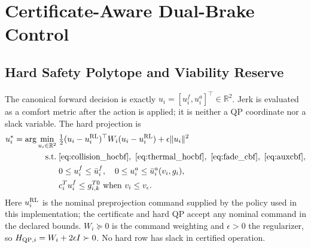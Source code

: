 \section{Certificate-Aware Dual-Brake Control}
\subsection{Hard Safety Polytope and Viability Reserve}
The canonical forward decision is exactly $u_i=[u_i^f,u_i^a]^\top\in\mathbb R^2$. Jerk is evaluated as a comfort metric after the action is applied; it is neither a QP coordinate nor a slack variable. The hard projection is
\begin{subequations}\label{eq:qp}
\begin{align}
u_i^*=\arg\min_{u_i\in\mathbb R^2}\;&\tfrac12(u_i-u_i^{\rm RL})^\top W_i(u_i-u_i^{\rm RL})
+\epsilon\|u_i\|^2\\
\mathrm{s.t.}\;&\eqref{eq:collision_hocbf},\ \eqref{eq:thermal_hocbf},\ \eqref{eq:fade_cbf},\ \eqref{eq:auxcbf},\\
&0\le u_i^f\le\bar u_i^f,\quad 0\le u_i^a\le\bar u_i^a(v_i,g_i),\\
&c_i^Tu_i^f\le g_{i,k}^{T0}\ \text{when }v_i\le v_\epsilon.
\end{align}
\end{subequations}
Here $u_i^{\rm RL}$ is the nominal preprojection command supplied by the policy used in this implementation; the certificate and hard QP accept any nominal command in the declared bounds. $W_i\succeq0$ is the command weighting and $\epsilon>0$ the regularizer, so $H_{{\rm QP},i}=W_i+2\epsilon I\succ0$. No hard row has slack in certified operation.

